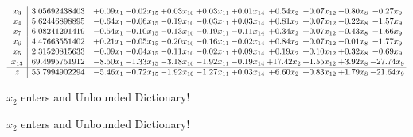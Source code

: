 \documentclass[9pt]{article}
\begin{document}
 \[\begin{array}{c| c c@{\hskip 2pt} c@{\hskip 2pt} c@{\hskip 2pt} c@{\hskip 2pt} c@{\hskip 2pt} c@{\hskip 2pt} c@{\hskip 2pt} c@{\hskip 2pt} c@{\hskip 2pt} }
 x_{3}   &  3.05692438403 & +  0.09 x_{1} & -0.02 x_{15} & +  0.03 x_{10} & +  0.03 x_{11} & +  0.01 x_{14} & +  0.54 x_{2} & -0.07 x_{12} & -0.80 x_{8} & -0.27 x_{9}\\
 x_{4}   &  5.62446898895 & -0.64 x_{1} & -0.06 x_{15} & -0.19 x_{10} & -0.03 x_{11} & +  0.03 x_{14} & +  0.81 x_{2} & +  0.07 x_{12} & -0.22 x_{8} & -1.57 x_{9}\\
 x_{7}   &  6.08241291419 & -0.54 x_{1} & -0.10 x_{15} & -0.13 x_{10} & -0.19 x_{11} & -0.11 x_{14} & +  0.34 x_{2} & +  0.07 x_{12} & -0.43 x_{8} & -1.66 x_{9}\\
 x_{6}   &  4.47663551402 & +  0.21 x_{1} & -0.05 x_{15} & -0.20 x_{10} & -0.16 x_{11} & -0.02 x_{14} & +  0.84 x_{2} & +  0.07 x_{12} & -0.01 x_{8} & -1.77 x_{9}\\
 x_{5}   &  2.31520815633 & -0.09 x_{1} & -0.04 x_{15} & -0.11 x_{10} & -0.02 x_{11} & +  0.09 x_{14} & +  0.19 x_{2} & +  0.10 x_{12} & +  0.32 x_{8} & -0.69 x_{9}\\
 x_{13}   &  69.4995751912 & -8.50 x_{1} & -1.33 x_{15} & -3.18 x_{10} & -1.92 x_{11} & -0.19 x_{14} & + 17.42 x_{2} & +  1.55 x_{12} & +  3.92 x_{8} & -27.74 x_{9}\\
\hline
z    &  55.7994902294 & -5.46 x_{1} & -0.72 x_{15} & -1.92 x_{10} & -1.27 x_{11} & +  0.03 x_{14} & +  6.60 x_{2} & +  0.83 x_{12} & +  1.79 x_{8} & -21.64 x_{9}\\
\end{array}\]


 $ x_{2} $ enters and Unbounded Dictionary!


 $ x_{2} $ enters and Unbounded Dictionary!
\end{document}
